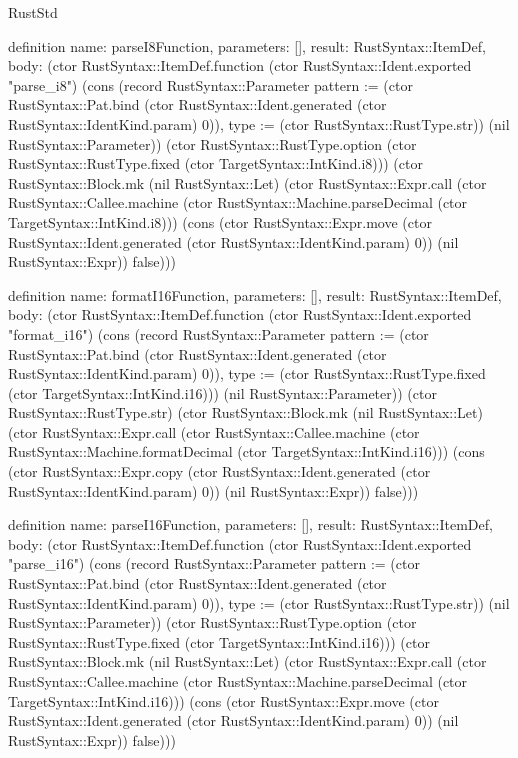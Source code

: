 \begin{lexlean}{RustStd}
\begin{semanticmodule}
definition{
  name: parseI8Function,
  parameters: [],
  result: RustSyntax::ItemDef,
  body: (ctor RustSyntax::ItemDef.function (ctor RustSyntax::Ident.exported "parse_i8") (cons (record RustSyntax::Parameter {pattern := (ctor RustSyntax::Pat.bind (ctor RustSyntax::Ident.generated (ctor RustSyntax::IdentKind.param) 0)), type := (ctor RustSyntax::RustType.str)}) (nil RustSyntax::Parameter)) (ctor RustSyntax::RustType.option (ctor RustSyntax::RustType.fixed (ctor TargetSyntax::IntKind.i8))) (ctor RustSyntax::Block.mk (nil RustSyntax::Let) (ctor RustSyntax::Expr.call (ctor RustSyntax::Callee.machine (ctor RustSyntax::Machine.parseDecimal (ctor TargetSyntax::IntKind.i8))) (cons (ctor RustSyntax::Expr.move (ctor RustSyntax::Ident.generated (ctor RustSyntax::IdentKind.param) 0)) (nil RustSyntax::Expr)) false)))
}

definition{
  name: formatI16Function,
  parameters: [],
  result: RustSyntax::ItemDef,
  body: (ctor RustSyntax::ItemDef.function (ctor RustSyntax::Ident.exported "format_i16") (cons (record RustSyntax::Parameter {pattern := (ctor RustSyntax::Pat.bind (ctor RustSyntax::Ident.generated (ctor RustSyntax::IdentKind.param) 0)), type := (ctor RustSyntax::RustType.fixed (ctor TargetSyntax::IntKind.i16))}) (nil RustSyntax::Parameter)) (ctor RustSyntax::RustType.str) (ctor RustSyntax::Block.mk (nil RustSyntax::Let) (ctor RustSyntax::Expr.call (ctor RustSyntax::Callee.machine (ctor RustSyntax::Machine.formatDecimal (ctor TargetSyntax::IntKind.i16))) (cons (ctor RustSyntax::Expr.copy (ctor RustSyntax::Ident.generated (ctor RustSyntax::IdentKind.param) 0)) (nil RustSyntax::Expr)) false)))
}

definition{
  name: parseI16Function,
  parameters: [],
  result: RustSyntax::ItemDef,
  body: (ctor RustSyntax::ItemDef.function (ctor RustSyntax::Ident.exported "parse_i16") (cons (record RustSyntax::Parameter {pattern := (ctor RustSyntax::Pat.bind (ctor RustSyntax::Ident.generated (ctor RustSyntax::IdentKind.param) 0)), type := (ctor RustSyntax::RustType.str)}) (nil RustSyntax::Parameter)) (ctor RustSyntax::RustType.option (ctor RustSyntax::RustType.fixed (ctor TargetSyntax::IntKind.i16))) (ctor RustSyntax::Block.mk (nil RustSyntax::Let) (ctor RustSyntax::Expr.call (ctor RustSyntax::Callee.machine (ctor RustSyntax::Machine.parseDecimal (ctor TargetSyntax::IntKind.i16))) (cons (ctor RustSyntax::Expr.move (ctor RustSyntax::Ident.generated (ctor RustSyntax::IdentKind.param) 0)) (nil RustSyntax::Expr)) false)))
}


\end{semanticmodule}
\end{lexlean}
